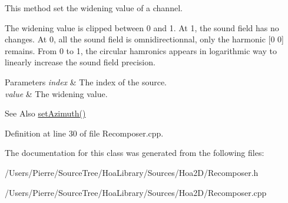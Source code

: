 This method set the widening value of a channel. 

The widening value is clipped between 0 and 1. At 1, the sound field has no changes. At 0, all the sound field is omnidirectionnal, only the harmonic \mbox{[}0 0\mbox{]} remains. From 0 to 1, the circular hamronics appears in logarithmic way to linearly increase the sound field precision.


\begin{DoxyParams}{Parameters}
{\em index} & The index of the source. \\
\hline
{\em value} & The widening value. \\
\hline
\end{DoxyParams}
\begin{DoxySeeAlso}{See Also}
\hyperlink{class_hoa2_d_1_1_recomposer_a2c1827fa0b25648b787077469e52a820}{set\-Azimuth()} 
\end{DoxySeeAlso}


Definition at line 30 of file Recomposer.\-cpp.



The documentation for this class was generated from the following files\-:\begin{DoxyCompactItemize}
\item 
/\-Users/\-Pierre/\-Source\-Tree/\-Hoa\-Library/\-Sources/\-Hoa2\-D/Recomposer.\-h\item 
/\-Users/\-Pierre/\-Source\-Tree/\-Hoa\-Library/\-Sources/\-Hoa2\-D/Recomposer.\-cpp\end{DoxyCompactItemize}
